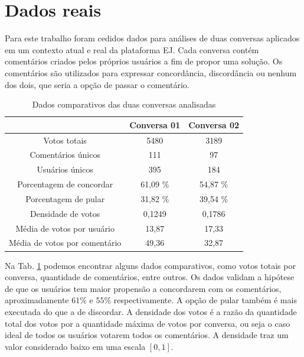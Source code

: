 \section{Dados reais}
\label{chap:dados-reais}

Para este trabalho foram cedidos dados para análises de duas conversas aplicados em um contexto atual e real da plataforma EJ. Cada conversa contém comentários criados pelos próprios usuários a fim de propor uma solução. Os comentários são utilizados para expressar concordância, discordância ou nenhum dos dois, que seria a opção de passar o comentário.



\begin{table}[!h]
\centering
\begin{tabular}{|c|c|c|}
\hline
                           & \textbf{Conversa 01} & \textbf{Conversa 02} \\ \hline
Votos totais               & 5480                 & 3189                 \\ \hline
Comentários únicos         & 111                  & 97                   \\ \hline
Usuários únicos            & 395                  & 184                  \\ \hline
Porcentagem de concordar    & 61,09 \%                   & 54,87 \%                   \\ \hline
Porcentagem de pular &    31,82 \%              & 39,54 \%                   \\ \hline
Densidade de votos            & 0,1249                  & 0,1786                  \\ \hline
Média de votos por usuário            & 13,87                  & 17,33                  \\ \hline
Média de votos por comentário            & 49,36 & 32,87                  \\ \hline

\end{tabular}
\caption{Dados comparativos das duas conversas analisadas}
\label{tab:dados-comparativos-conversas}
\end{table}

 
Na Tab. \ref{tab:dados-comparativos-conversas} podemos encontrar alguns dados comparativos, como votos totais por conversa, quantidade de comentários, entre outros. 
Os dados validam a hipótese de que os usuários tem maior propensão a concordarem com os comentários, aproximadamente $61\%$ e $55\%$ respectivamente. A opção de pular também é mais executada do que a de discordar.
A densidade dos votos é a razão da quantidade total dos votos por a quantidade máxima de votos por conversa, ou seja o caso ideal de todos os usuários votarem todos os comentários. A densidade traz um valor considerado baixo em uma escala $[0,1]$.




